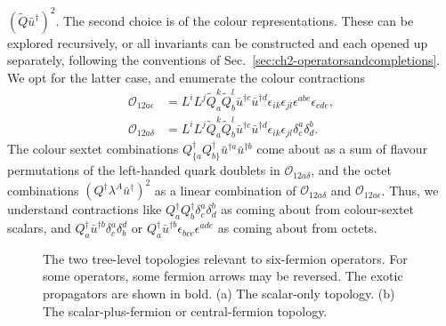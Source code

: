 $(\tilde{Q}\bar{u}^{\dagger})^{2}$. The second choice is of the colour
representations. These can be explored recursively, or all invariants can be
constructed and each opened up separately, following the conventions of
Sec.~\ref{sec:ch2-operatorsandcompletions}. We opt for the latter case, and
enumerate the colour contractions
\begin{subequations}
  \begin{align}
    \mathcal{O}_{12a\epsilon} &= L^{i} L^{j} \tilde{Q}^{k}_{a} \tilde{Q}^{l}_{b} \bar{u}^{\dagger c} \bar{u}^{\dagger d} \epsilon_{ik}\epsilon_{jl} \epsilon^{abe}\epsilon_{cde}, \\
    \mathcal{O}_{12a\delta} &= L^{i} L^{j} \tilde{Q}^{k}_{a} \tilde{Q}^{l}_{b} \bar{u}^{\dagger c} \bar{u}^{\dagger d} \epsilon_{ik}\epsilon_{jl} \delta_{c}^{a} \delta_{d}^{b}.
  \end{align}
\end{subequations}
The colour sextet combinations
$Q^{\dagger}_{\{a} Q^{\dagger}_{b\}} \bar{u}^{\dagger a} \bar{u}^{\dagger b}$
come about as a sum of flavour permutations of the left-handed quark doublets in
$\mathcal{O}_{12a\delta}$, and the octet combinations
$(Q^{\dagger} \lambda^{A} \bar{u}^{\dagger})^{2}$ as a linear combination of
$\mathcal{O}_{12a\delta}$ and $\mathcal{O}_{12a\epsilon}$. Thus, we understand
contractions like
$Q^{\dagger}_{a} Q^{\dagger}_{b} \delta^{a}_{c} \delta^{b}_{d}$ as coming about
from colour-sextet scalars, and
$Q^{\dagger}_{a} \bar{u}^{\dagger b} \delta^{a}_{c} \delta^{d}_{b}$ or
$Q^{\dagger}_{a} \bar{u}^{\dagger b} \epsilon_{bce}\epsilon^{ade}$ as coming
about from octets.

\begin{figure}[t]
  \centering
  \caption[The two tree-level topologies relevant to six-fermion operators.]{The
    two tree-level topologies relevant to six-fermion operators. For some
    operators, some fermion arrows may be reversed. The exotic propagators are
    shown in bold. (a) The scalar-only topology. (b) The scalar-plus-fermion or
    central-fermion topology.}
  \label{fig:ch2-6f-topologies}
\end{figure}

